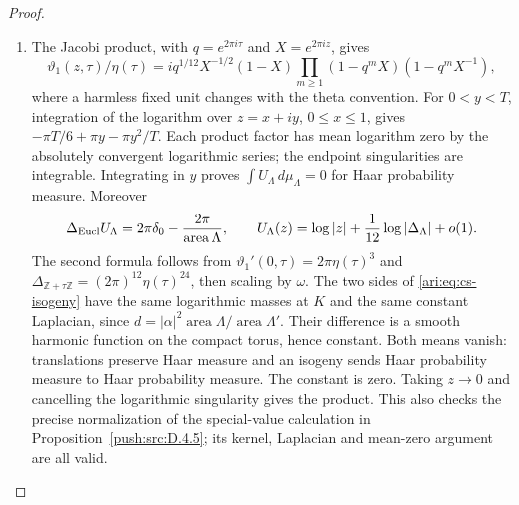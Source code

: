 \begin{proof}
\begin{enumerate}[label=\arabic*.,leftmargin=*]
\item The Jacobi product, with $q=e^{2\pi i\tau}$ and
$X=e^{2\pi iz}$, gives
\[
 \vartheta _1(z,\tau)/\eta(\tau)
 =i q^{1/12}X^{-1/2}(1-X)
     \prod_{m\ge1}(1-q^mX)(1-q^mX^{-1}),
\]
where a harmless fixed unit changes with the theta convention. For
$0<y<T$, integration of the logarithm over $z=x+iy$, $0\le x\le1$,
gives $-\pi T/6+\pi y-\pi y^2/T$. Each product factor has mean logarithm
zero by the absolutely convergent logarithmic series; the endpoint
singularities are integrable. Integrating in $y$ proves
$\int U_\Lambda\,d\mu_\Lambda=0$ for Haar probability measure.
Moreover
\[
 \Delta_{\rm Eucl}U_\Lambda
   =2\pi\delta_0-\frac{2\pi}{\operatorname{area}\Lambda},\qquad
 U_\Lambda(z)=\log|z|+\frac1{12}\log|\Delta_\Lambda|+o(1).
\]
The second formula follows from
$\vartheta _1'(0,\tau)=2\pi\eta(\tau)^3$ and
$\Delta_{\mathbb Z+\tau\mathbb Z}=(2\pi)^{12}\eta(\tau)^{24}$,
then scaling by $\omega$. The two sides of
\eqref{ari:eq:cs-isogeny} have the same logarithmic masses at $K$ and the
same constant Laplacian, since
$d=|\alpha|^2\operatorname{area}\Lambda/
\operatorname{area}\Lambda'$. Their difference is a smooth harmonic
function on the compact torus, hence constant. Both means vanish:
translations preserve Haar measure and an isogeny sends Haar
probability measure to Haar probability measure. The constant is zero.
Taking $z\to0$ and cancelling the logarithmic singularity gives the
product. This also checks the precise normalization of the special-value calculation in Proposition~\ref{push:src:D.4.5};
its kernel, Laplacian and mean-zero argument are all valid.
\end{enumerate}
\end{proof}
